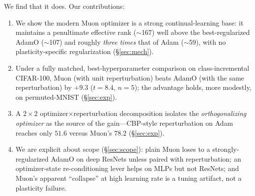 \documentclass[letterpaper,twocolumn,10pt]{article}
\begin{document}
We find that it does. Our contributions:
\begin{enumerate}\itemsep2pt
\item We show the modern Muon optimizer is a strong continual-learning base: it maintains a penultimate effective rank ($\sim$167) well above the best-regularized AdamO ($\sim$107) and roughly \emph{three times} that of Adam ($\sim$59), with no plasticity-specific regularization (\S\ref{sec:mech}).
\item Under a fully matched, best-hyperparameter comparison on class-incremental CIFAR-100, Muon (with unit reperturbation) beats AdamO (with the same reperturbation) by $+9.3$ ($t{=}8.4$, $n{=}5$); the advantage holds, more modestly, on permuted-MNIST (\S\ref{sec:exp}).
\item A $2{\times}2$ optimizer$\times$reperturbation decomposition isolates the \emph{orthogonalizing optimizer} as the source of the gain---CBP-style reperturbation on Adam reaches only $51.6$ versus Muon's $78.2$ (\S\ref{sec:exp}).
\item We are explicit about scope (\S\ref{sec:scope}): plain Muon loses to a strongly-regularized AdamO on deep ResNets unless paired with reperturbation; an optimizer-state re-conditioning lever helps on MLPs but not ResNets; and Muon's apparent ``collapse'' at high learning rate is a tuning artifact, not a plasticity failure.
\end{enumerate}
\end{document}
